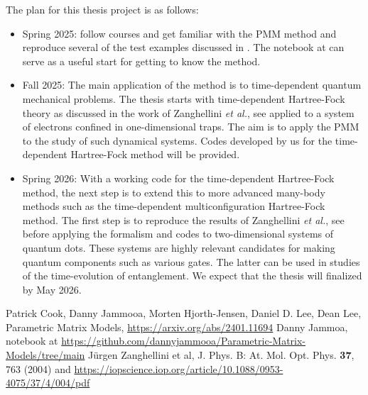 \documentclass{article}
\begin{document}
The plan for this thesis project is as follows:
\begin{itemize}
\item Spring 2025: follow courses and get familiar with the PMM method
and reproduce several of the test examples discussed in \cite{us2024}. 
The notebook at \cite{dannynotebook} can serve as a useful start for getting to know the method.
\item Fall 2025: The main application of the method is to time-dependent quantum mechanical problems. The thesis starts with time-dependent Hartree-Fock theory as discussed in the work of Zanghellini {\em et al.}, see \cite{zanghellini} applied to a system of electrons confined in one-dimensional traps. The aim is to apply the PMM to the study of such dynamical systems. Codes developed by us for the time-dependent Hartree-Fock method will be provided.
\item Spring 2026: With a working code for the time-dependent Hartree-Fock method, the next step is to extend this to more advanced many-body methods such as the time-dependent multiconfiguration Hartree-Fock method. The first step is to reproduce the results of Zanghellini {\em et al.}, see \cite{zanghellini} before applying the formalism and codes to two-dimensional systems of quantum dots. These systems are highly relevant candidates for making quantum components such as various gates. The latter can be used in studies of the time-evolution of entanglement. We expect that the thesis will finalized by May 2026. 
\end{itemize}

\begin{thebibliography}{99}

 Patrick Cook, Danny Jammooa, Morten Hjorth-Jensen, Daniel D. Lee, Dean Lee, Parametric Matrix Models, \url{https://arxiv.org/abs/2401.11694}
 Danny Jammoa, notebook at  \url{https://github.com/dannyjammooa/Parametric-Matrix-Models/tree/main}  
 Jürgen Zanghellini et al, J. Phys. B: At. Mol. Opt. Phys. {\bf 37},  763 (2004) and \url{https://iopscience.iop.org/article/10.1088/0953-4075/37/4/004/pdf}
\end{thebibliography}  
\end{document}
